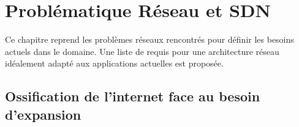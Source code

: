 \chapter{Problématique Réseau et SDN}
\label{chap-1}



Ce chapitre reprend les problèmes réseaux rencontrés pour définir les besoins actuels dans le domaine. 
Une liste de requis pour une architecture réseau idéalement adapté aux applications actuelles est proposée.


\section{Ossification de l'internet face au besoin d'expansion}







